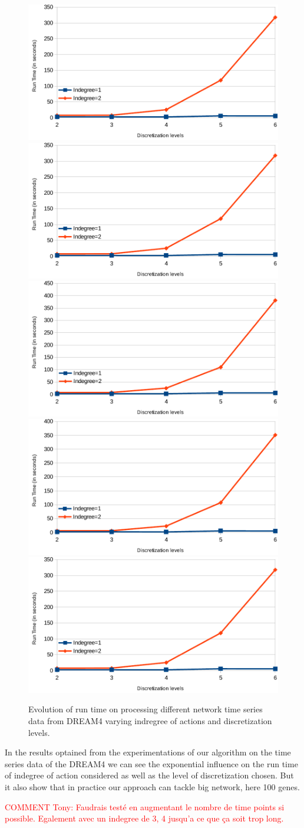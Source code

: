 	\begin{figure} \centering
	\includegraphics[width=0.33\linewidth]{images/net5}%
	\includegraphics[width=0.33\linewidth]{images/net5}%
	\includegraphics[width=0.33\linewidth]{images/net3}
	\includegraphics[width=0.33\linewidth]{images/net4}
	\includegraphics[width=0.33\linewidth]{images/net5}
	\label{fig:run_time}
	\caption{Evolution of run time on processing different network time series data from DREAM4 varying indregree of actions and discretization levels.}
	\end{figure}

	In the results optained from the experimentations of our algorithm on the time series data of the DREAM4 we can see the exponential influence on the run time of indegree of action considered as well as the level of discretization chosen.
	But it also show that in practice our approach can tackle big network, here 100 genes.

\textcolor{red}{COMMENT Tony: Faudrais testé en augmentant le nombre de time points si possible. Egalement avec un indegree de 3, 4 jusqu'a ce que ça soit trop long.}

